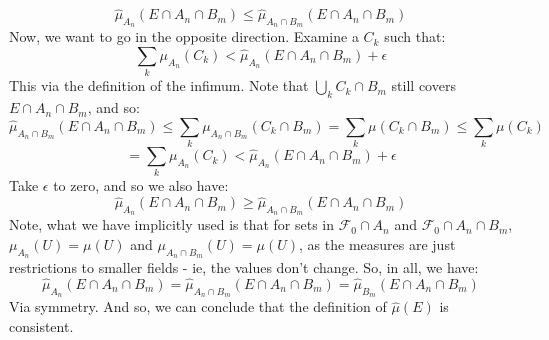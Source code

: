 \documentclass[12pt,a4paper]{article}
\newcommand{\1}[1]{\mathbbm{1}\left\{ #1 \right\}}
\newcommand{\fcal}{\mathcal{F}}
\begin{document}
\begin{enumerate}
	$$
		\hat{\mu}_{A_n}(E \cap A_n \cap B_m) \leq \hat{\mu}_{A_n \cap B_m}(E \cap A_n \cap B_m)
	$$
	Now, we want to go in the opposite direction. Examine a $C_k$ such that:
	$$
		\sum_k \mu_{A_n}(C_k) < \hat{\mu}_{A_n}(E \cap A_n \cap B_m) + \epsilon
	$$
	This via the definition of the infimum. Note that $\bigcup_k C_k \cap B_m$ still covers $E \cap A_n \cap B_m$, and so:
	$$
		\hat{\mu}_{A_n \cap B_m}(E \cap A_n \cap B_m) \leq
		\sum_k \mu_{A_n \cap B_m}(C_k \cap B_m) =
		\sum_k \mu(C_k \cap B_m) \leq
		\sum_k \mu(C_k)
	$$
	$$
		= \sum_k \mu_{A_n}(C_k) < \hat{\mu}_{A_n}(E \cap A_n \cap B_m) + \epsilon
	$$
	Take $\epsilon$ to zero, and so we also have:
	$$
		\hat{\mu}_{A_n}(E \cap A_n \cap B_m) \geq \hat{\mu}_{A_n \cap B_m}(E \cap A_n \cap B_m)
	$$
	Note, what we have implicitly used is that for sets in $\fcal_0 \cap A_n$ and $\fcal_0 \cap A_n \cap B_m$, $\mu_{A_n}(U) = \mu(U)$ and $\mu_{A_n \cap B_m}(U) = \mu(U)$, as the measures are just restrictions to smaller fields - ie, the values don't change. So, in all, we have:
	$$
		\hat{\mu}_{A_n}(E \cap A_n \cap B_m) = \hat{\mu}_{A_n \cap B_m}(E \cap A_n \cap B_m) =
		\hat{\mu}_{B_m}(E \cap A_n \cap B_m)
	$$
	Via symmetry. And so, we can conclude that the definition of $\hat{\mu}(E)$ is consistent.
	

\end{enumerate}
\end{document}

